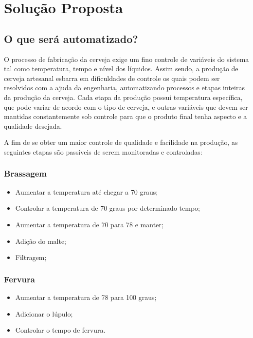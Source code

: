 \newpage

\section{Solução Proposta}

\subsection{O que será automatizado?}

O processo de fabricação da cerveja exige um fino controle de variáveis do sistema tal como temperatura, tempo e nível dos líquidos. Assim sendo, a produção de cerveja artesanal esbarra em dificuldades de controle os quais podem ser resolvidos com a ajuda da engenharia, automatizando processos e etapas inteiras da produção da cerveja. Cada etapa da produção possui temperatura específica, que pode variar de acordo com o tipo de cerveja, e outras variáveis que devem ser mantidas constantemente sob controle para que o produto final tenha aspecto e a qualidade desejada.

A fim de se obter um maior controle de qualidade e facilidade na produção, as seguintes etapas são passíveis de serem monitoradas e controladas:

\subsubsection{Brassagem}
\begin{itemize}
    \item Aumentar a temperatura até chegar a 70 graus;
    \item Controlar a temperatura de 70 graus por determinado tempo;
    \item Aumentar a temperatura de 70 para 78 e manter;
    \item Adição do malte;
    \item Filtragem;
\end{itemize}

\subsubsection{Fervura}
\begin{itemize}
    \item Aumentar a temperatura de 78 para 100 graus;
    \item Adicionar o lúpulo;
    \item Controlar o tempo de fervura.
\end{itemize}


